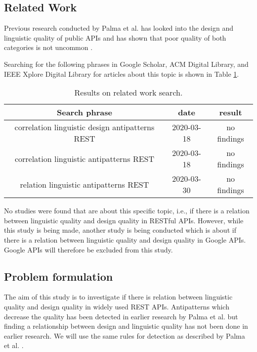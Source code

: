 \subsection{Related Work}

Previous research conducted by Palma et al. has looked into the design and linguistic quality of public APIs and has shown that poor quality of both categories is not uncommon \cite{design}\cite{linguistic}.

Searching for the following phrases in Google Scholar, ACM Digital Library, and IEEE Xplore Digital Library for articles about this topic is shown in Table \ref{tab:Resultofrelatedworksearch}.

\begin{table}[!ht]
\begin{center}
\begin{tabular}{| c | c | c |}
\hline \textbf{Search phrase} & \textbf{date} & \textbf{result} \\
\hline 
correlation linguistic design antipatterns REST &
2020-03-18 & 
no findings
\\ \hline
correlation linguistic antipatterns REST &
2020-03-18 &
no findings
\\ \hline
relation linguistic antipatterns REST &
2020-03-30 & 
no findings
\\ \hline
\end{tabular}
 \caption{Results on related work search.}
 \label{tab:Resultofrelatedworksearch}
\end{center}
\end{table}

No studies were found that are about this specific topic, i.e., if there is a relation between linguistic quality and design quality in RESTful APIs. However, while this study is being made, another study is being conducted which is about if there is a relation between linguistic quality and design quality in Google APIs. Google APIs will therefore be excluded from this study.

\subsection{Problem formulation}
The aim of this study is to investigate if there is relation between  linguistic quality and design quality in widely used REST APIs. Antipatterns which decrease the quality has been detected in earlier research by Palma et al. \cite{linguistic}\cite{design} but finding a relationship between design and linguistic quality has not been done in earlier research. We will use the same rules for detection as described by Palma et al. \cite{linguistic} \cite{design}.

